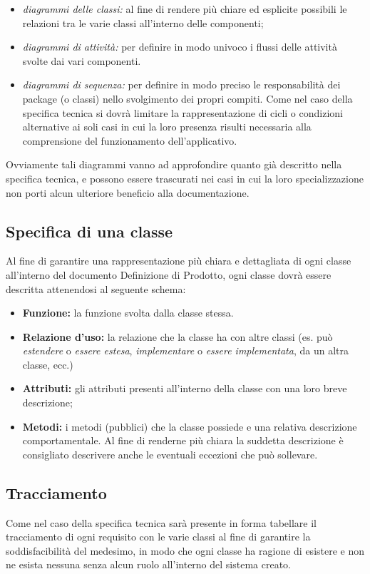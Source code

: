 {\begin{itemize}
\item \textit{diagrammi delle classi:} al fine di rendere più chiare ed esplicite possibili le relazioni tra le varie classi all'interno delle componenti;
\item \textit{diagrammi di attività:} per definire in modo univoco i flussi delle attività svolte dai vari componenti.
\item \textit{diagrammi di sequenza:} per definire in modo preciso le responsabilità dei package (o classi) nello svolgimento dei propri compiti. Come nel caso della specifica tecnica si dovrà limitare la rappresentazione di cicli o condizioni alternative ai soli casi in cui la loro presenza risulti necessaria alla comprensione del funzionamento dell'applicativo.
\end{itemize}

Ovviamente tali diagrammi vanno ad approfondire quanto già descritto nella specifica tecnica, e possono essere trascurati nei casi in cui la loro specializzazione non porti alcun ulteriore beneficio alla documentazione.

\subsection{Specifica di una classe}
Al fine di garantire una rappresentazione più chiara e dettagliata di ogni classe all'interno del documento Definizione di Prodotto, ogni classe dovrà essere descritta attenendosi al seguente schema:

\begin{itemize} 
\item \textbf{Funzione:} la funzione svolta dalla classe stessa.
\item \textbf{Relazione d'uso:} la relazione che la classe ha con altre classi (es. può \textit{estendere} o \textit{essere estesa}, \textit{implementare} o \textit{essere implementata}, da un altra classe, ecc.)
\item \textbf{Attributi:} gli attributi presenti all'interno della classe con una loro breve descrizione;
\item \textbf{Metodi:} i metodi (pubblici) che la classe possiede e una relativa descrizione comportamentale. Al fine di renderne più chiara la suddetta descrizione è consigliato descrivere anche le eventuali eccezioni che può sollevare.
\end{itemize}

\subsection{Tracciamento}
Come nel caso della specifica tecnica sarà presente in forma tabellare il tracciamento di ogni requisito con le varie classi al fine di garantire la soddisfacibilità del medesimo, in modo che ogni classe ha ragione di esistere e non ne esista nessuna senza alcun ruolo all'interno del sistema creato.

}
